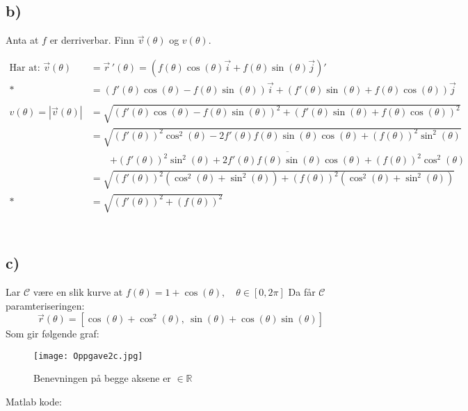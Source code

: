 \documentclass[a4paper, norsk, twoside, 10pt]{article}
\begin{document}
  \subsection*{b)}
  Anta at $f$ er derriverbar. Finn $\vec{v}(\theta)$ og $v(\theta)$.

  \[\begin{split}
      \text{Har at: } \vec{v}(\theta) &= \vec{r}\,'(\theta) = (f(\theta)\cos(\theta)\vec{i} + f(\theta)\sin(\theta)\vec{j})'\\*
      &= (f'(\theta)\cos(\theta) - f(\theta)\sin(\theta))\vec{i} + (f'(\theta)\sin(\theta) + f(\theta)\cos(\theta))\vec{j}\\
&\\
      v(\theta) = |\vec{v}(\theta)| &= \sqrt{ (f'(\theta)\cos(\theta) - f(\theta)\sin(\theta))^{2} + (f'(\theta)\sin(\theta) + f(\theta)\cos(\theta))^{2}} \\
      &= \sqrt{(f'(\theta))^{2}\cos^{2}(\theta) - 2f'(\theta)f(\theta)\sin(\theta)\cos(\theta) +(f(\theta))^{2}\sin^{2}(\theta)}\\&\qquad \overline{+ (f'(\theta))^{2}\sin^{2}(\theta) + 2f'(\theta)f(\theta)\sin(\theta)\cos(\theta) + (f(\theta))^{2}\cos^{2}(\theta)}\\
      &=\sqrt{(f'(\theta))^{2}(\cos^{2}(\theta) + \sin^{2}(\theta)) + (f(\theta))^{2}(\cos^{2}(\theta) + \sin^{2}(\theta))}\\*
      &=\sqrt{(f'(\theta))^{2} + (f(\theta))^{2}} \\
    \end{split}\]
  \\


  \subsection*{c)}
 
  Lar $\mathcal{C}$ være en slik kurve at $f(\theta) = 1 + \cos(\theta), \quad \theta \in [0, 2\pi]$
  Da får $\mathcal{C}$ paramteriseringen:
  \[\vec{r}(\theta) = [\cos(\theta) + \cos^{2}(\theta),\: \sin(\theta) + \cos(\theta)\sin(\theta)]\]
  Som gir følgende graf:
    \begin{figure}[H]
    \begin{center}
      \texttt{[image: Oppgave2c.jpg]}
      \caption{{\tiny Benevningen på begge aksene er $\in \mathbb{R}$}}
    \end {center}
  \end{figure}
        Matlab kode:
        
\end{document}
